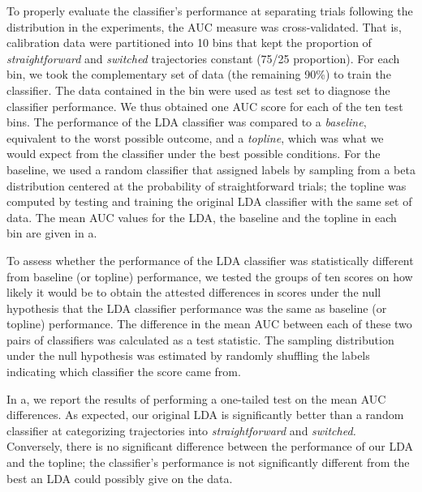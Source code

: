 \documentclass{article}
\begin{document}
To properly evaluate the classifier's performance at separating trials following the distribution in the experiments, the AUC measure was cross-validated. That is, calibration data were partitioned into 10 bins that kept the proportion of \textit{straightforward} and \textit{switched} trajectories constant (75/25 proportion). For each bin, we took the complementary set of data (the remaining 90\%) to train the classifier. The data contained in the bin were used as test set to diagnose the classifier performance. We thus obtained one AUC score for each of the ten test bins. The performance of the LDA classifier was compared to a \emph{baseline}, equivalent to the worst possible outcome, and a \emph{topline}, which was what we would expect from the classifier under the best possible conditions. 
For the baseline, we used a random classifier that assigned labels by sampling from a beta distribution centered at the probability of straightforward trials; the topline was computed by testing and training the original LDA classifier with the same set of data. 
The mean AUC values for the LDA, the baseline and the topline in each bin are given in a. 

To assess whether the performance of the LDA classifier was statistically different from baseline (or topline) performance, we tested the groups of ten scores on how likely it would be to obtain the attested differences in scores under the null hypothesis that the LDA classifier performance was the same as  baseline (or topline) performance.   
The difference in the mean AUC between each of these two pairs of classifiers was calculated as a test statistic. The sampling distribution under the null hypothesis was estimated by randomly shuffling the labels indicating which classifier the score came from.

In a, we report the results of performing a one-tailed test on the mean AUC differences. As expected, our original LDA is significantly better than a random classifier at categorizing trajectories into \emph{straightforward} and \emph{switched.} Conversely, there is no significant difference between the performance of our LDA and the topline; the classifier's performance is not significantly different from the best an LDA could possibly give on the data. 
\end{document}
